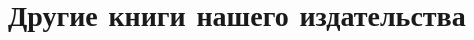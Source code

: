 \documentclass[a5paper,11pt]{memoir}
\begin{document}
























\cleartorecto 
\thispagestyle{empty}  %


\section*{Другие книги нашего издательства}
\end{document}
